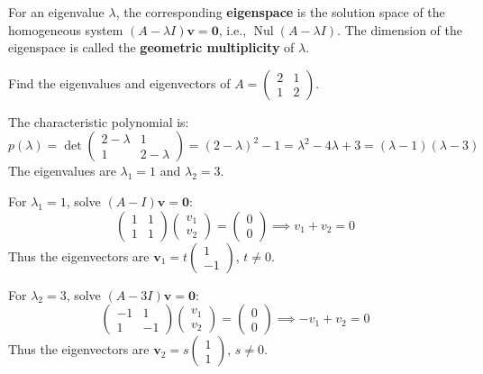 \documentclass[oneside]{book}
\begin{document}
\begin{definition}[Eigenspace]
For an eigenvalue $\lambda$, the corresponding \textbf{eigenspace} is the solution space of the homogeneous system $(A - \lambda I)\mathbf{v} = \mathbf{0}$, i.e., $\operatorname{Nul}(A - \lambda I)$. The dimension of the eigenspace is called the \textbf{geometric multiplicity} of $\lambda$.
\end{definition}

\begin{example}
Find the eigenvalues and eigenvectors of $A = \begin{pmatrix} 2 & 1 \\ 1 & 2 \end{pmatrix}$.

The characteristic polynomial is:
\[
p(\lambda) = \det \begin{pmatrix} 2-\lambda & 1 \\ 1 & 2-\lambda \end{pmatrix} = (2-\lambda)^2 - 1 = \lambda^2 - 4\lambda + 3 = (\lambda-1)(\lambda-3)
\]
The eigenvalues are $\lambda_1 = 1$ and $\lambda_2 = 3$.

For $\lambda_1 = 1$, solve $(A - I)\mathbf{v} = \mathbf{0}$:
\[
\begin{pmatrix} 1 & 1 \\ 1 & 1 \end{pmatrix} \begin{pmatrix} v_1 \\ v_2 \end{pmatrix} = \begin{pmatrix} 0 \\ 0 \end{pmatrix} \implies v_1 + v_2 = 0
\]
Thus the eigenvectors are $\mathbf{v}_1 = t \begin{pmatrix} 1 \\ -1 \end{pmatrix}$, $t \neq 0$.

For $\lambda_2 = 3$, solve $(A - 3I)\mathbf{v} = \mathbf{0}$:
\[
\begin{pmatrix} -1 & 1 \\ 1 & -1 \end{pmatrix} \begin{pmatrix} v_1 \\ v_2 \end{pmatrix} = \begin{pmatrix} 0 \\ 0 \end{pmatrix} \implies -v_1 + v_2 = 0
\]
Thus the eigenvectors are $\mathbf{v}_2 = s \begin{pmatrix} 1 \\ 1 \end{pmatrix}$, $s \neq 0$.
\end{example}
\end{document}
